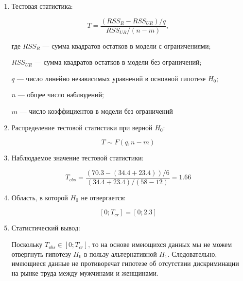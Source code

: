 \begin{problem}
\begin{sol}
\begin{enumerate}
\item Тестовая статистика:

\[
T = \frac{(RSS_R-RSS_{UR})/q}{RSS_{UR}/(n-m)},
\]

где $RSS_R$ — сумма квадратов остатков в модели с ограничениями;

$RSS_{UR}$ — сумма квадратов остатков в модели без ограничений;

$q$ — число линейно независимых уравнений в основной гипотезе $H_0$;

$n$ — общее число наблюдений;

$m$ — число коэффициентов в модели без ограничений

\item Распределение тестовой статистики при верной $H_0$:

\[
T \sim F(q, n-m)
\]

\item Наблюдаемое значение тестовой статистики:

\[
T_{obs} = \frac{(70.3-(34.4+23.4))/6}{(34.4+23.4)/(58-12)}=1.66
\]

\item Область, в которой $H_0$ не отвергается:

\[
[0;T_{cr}]=[0;2.3]
\]

\item Статистический вывод:

Поскольку $T_{obs} \in [0;T_{cr}]$, то на основе имеющихся данных мы не можем отвергнуть гипотезу $H_0$ в пользу альтернативной $H_1$. Следовательно, имеющиеся данные не противоречат гипотезе об отсутствии дискриминации на рынке труда между мужчинами и женщинами.

\end{enumerate}
\end{sol}
\end{problem}


